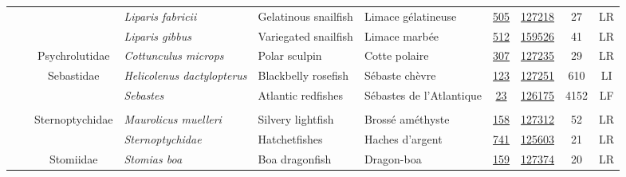 \documentclass[12pt]{article}\usepackage[]{graphicx}\usepackage[]{color}
\begin{document}
\begin{landscapepage}
\begin{longtable}[t]{ccc>{\centering\arraybackslash}p{3cm}>{\centering\arraybackslash}p{3cm}>{\centering\arraybackslash}p{3cm}>{}c>{}ccc}
\hspace{1em}\hspace{1em} &  &  & \em{Liparis fabricii} & Gelatinous snailfish & Limace gélatineuse & \href{#sec:505}{505} & \href{http://www.marinespecies.org/aphia.php?p=taxdetails&id=127218}{127218} & 27 & LR\\
\hspace{1em}\hspace{1em} &  &  & \em{Liparis gibbus} & Variegated snailfish & Limace marbée & \href{#sec:512}{512} & \href{http://www.marinespecies.org/aphia.php?p=taxdetails&id=159526}{159526} & 41 & LR\\
\hspace{1em}\hspace{1em} &  & Psychrolutidae & \em{Cottunculus microps} & Polar sculpin & Cotte polaire & \href{#sec:307}{307} & \href{http://www.marinespecies.org/aphia.php?p=taxdetails&id=127235}{127235} & 29 & LR\\
\hspace{1em}\hspace{1em} &  & Sebastidae & \em{Helicolenus dactylopterus} & Blackbelly rosefish & Sébaste chèvre & \href{#sec:123}{123} & \href{http://www.marinespecies.org/aphia.php?p=taxdetails&id=127251}{127251} & 610 & LI\\
\hspace{1em}\hspace{1em} &  &  & \em{Sebastes} & Atlantic redfishes & Sébastes de l'Atlantique & \href{#sec:23}{23} & \href{http://www.marinespecies.org/aphia.php?p=taxdetails&id=126175}{126175} & 4152 & LF\\
\addlinespace[0.3em]
\\
\hspace{1em}\hspace{1em} &  & Sternoptychidae & \em{Maurolicus muelleri} & Silvery lightfish & Brossé améthyste & \href{#sec:158}{158} & \href{http://www.marinespecies.org/aphia.php?p=taxdetails&id=127312}{127312} & 52 & LR\\
\hspace{1em}\hspace{1em} &  &  & \em{Sternoptychidae} & Hatchetfishes & Haches d'argent & \href{#sec:741}{741} & \href{http://www.marinespecies.org/aphia.php?p=taxdetails&id=125603}{125603} & 21 & LR\\
\hspace{1em}\hspace{1em} &  & Stomiidae & \em{Stomias boa} & Boa dragonfish & Dragon-boa & \href{#sec:159}{159} & \href{http://www.marinespecies.org/aphia.php?p=taxdetails&id=127374}{127374} & 20 & LR\\

\end{longtable}
\end{landscapepage}
\end{document}
